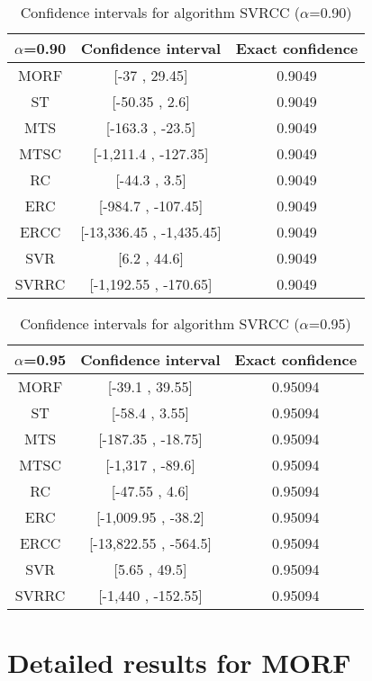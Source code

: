 \documentclass[a4paper,10pt]{article}
\begin{document}
\begin{table}[!htp]
\centering\small
\begin{tabular}{
|c|c|c|}
\hline
 $\alpha$=0.90 & Confidence interval & Exact confidence \\ \hline 
MORF & [-37 , 29.45] & 0.9049\\ \hline 
ST & [-50.35 , 2.6] & 0.9049\\ \hline 
MTS & [-163.3 , -23.5] & 0.9049\\ \hline 
MTSC & [-1,211.4 , -127.35] & 0.9049\\ \hline 
RC & [-44.3 , 3.5] & 0.9049\\ \hline 
ERC & [-984.7 , -107.45] & 0.9049\\ \hline 
ERCC & [-13,336.45 , -1,435.45] & 0.9049\\ \hline 
SVR & [6.2 , 44.6] & 0.9049\\ \hline 
SVRRC & [-1,192.55 , -170.65] & 0.9049\\ \hline 

\end{tabular}
\caption{Confidence intervals for algorithm SVRCC ($\alpha$=0.90)}
\end{table}
\begin{table}[!htp]
\centering\small
\begin{tabular}{
|c|c|c|}
\hline
 $\alpha$=0.95 & Confidence interval & Exact confidence \\ \hline 
MORF & [-39.1 , 39.55] & 0.95094\\ \hline 
ST & [-58.4 , 3.55] & 0.95094\\ \hline 
MTS & [-187.35 , -18.75] & 0.95094\\ \hline 
MTSC & [-1,317 , -89.6] & 0.95094\\ \hline 
RC & [-47.55 , 4.6] & 0.95094\\ \hline 
ERC & [-1,009.95 , -38.2] & 0.95094\\ \hline 
ERCC & [-13,822.55 , -564.5] & 0.95094\\ \hline 
SVR & [5.65 , 49.5] & 0.95094\\ \hline 
SVRRC & [-1,440 , -152.55] & 0.95094\\ \hline 

\end{tabular}
\caption{Confidence intervals for algorithm SVRCC ($\alpha$=0.95)}
\end{table}

 \clearpage 


\section{Detailed results for MORF}
\end{document}
